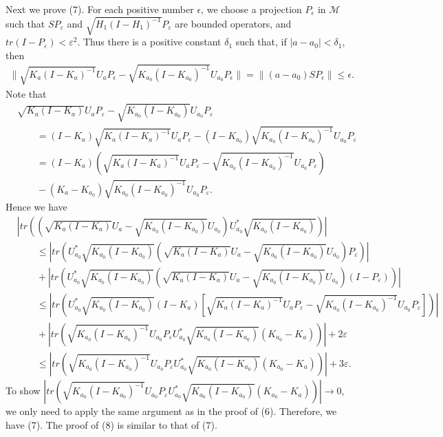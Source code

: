 \documentclass[12pt]{article}
\newcommand{\MMM}{\mathcal M}
\begin{document}
{Next we prove (7). For each positive number $\epsilon$, we choose a
projection $P_\epsilon$ in $\MMM$ such that $SP_{\varepsilon}$ and
$\sqrt{H_{1}(I-H_{1})^{-1}}P_{\varepsilon}$ are bounded operators,
and  $tr(I - P_{\varepsilon}) < \varepsilon^{2}$. Thus there is a
positive constant $\delta_{1}$ such that, if $|a-a_{0}| <
\delta_{1}$, then
\begin{align*}
\| \sqrt{K_a(I-K_a)^{-1}}U_{a}P_{\epsilon} -
\sqrt{K_{a_0}(I-K_{a_{0}})^{-1}}U_{a_0}P_{\epsilon}  \| = \|(a - a_0)SP_{\epsilon}  \| \leq
\epsilon .
\end{align*}
Note that
\begin{align*}
&\sqrt{K_{a}(I-K_{a})}U_{a}P_{\varepsilon}
-\sqrt{K_{a_0}(I-K_{a_0})}U_{a_0}P_{\varepsilon}\\
& \qquad =(I-K_a)\sqrt{K_{a}(I-K_{a})^{-1}}U_{a}P_{\varepsilon}-(I-K_{a_0})\sqrt{K_{a_{0}}(I-K_{a_{0}})^{-1}}U_{a_0}P_{\varepsilon}\\
& \qquad =(I-K_a)(\sqrt{K_{a}(I-K_{a})^{-1}}U_{a}P_{\varepsilon}-\sqrt{K_{a_{0}}(I-K_{a_{0}})^{-1}}U_{a_0}P_{\varepsilon})\\
& \qquad    -(K_a-K_{a_0})\sqrt{K_{a_{0}}(I-K_{a_{0}})^{-1}}U_{a_0}P_{\varepsilon}.
\end{align*}
Hence we have
\begin{align*}
&|tr((\sqrt{K_{a}(I-K_{a})}U_{a}
-\sqrt{K_{a_0}(I-K_{a_0})}U_{a_0})U^{*}_{a_0}\sqrt{K_{a_0}(I-K_{a_0})})|
\\
&\qquad \leq
|tr(U^{*}_{a_0}\sqrt{K_{a_0}(I-K_{a_0})}(\sqrt{K_{a}(I-K_{a})}U_{a}
-\sqrt{K_{a_0}(I-K_{a_0})}U_{a_0})P_{\varepsilon})
| \\
&\qquad +
|tr(U^{*}_{a_0}\sqrt{K_{a_0}(I-K_{a_0})}(\sqrt{K_{a}(I-K_{a})}U_{a}
-\sqrt{K_{a_0}(I-K_{a_0})}U_{a_0})(I-P_{\varepsilon}))
| \\
&\qquad\leq
|tr(U^{*}_{a_0}\sqrt{K_{a_0}(I-K_{a_0})}(I-K_{a})[\sqrt{K_a(I-K_a)^{-1}}U_{a}P_{\varepsilon}
- \sqrt{K_{a_0}(I-K_{a_{0}})^{-1}}U_{a_0}P_{\varepsilon}]) | \\
& \qquad +
|tr(\sqrt{K_{a_0}(I-K_{a_{0}})^{-1}}U_{a_0}P_{\varepsilon}U^{*}_{a_0}\sqrt{K_{a_0}(I-K_{a_0})}(K_{a_0}
-K_a))| + 2\varepsilon \\
&\qquad \leq
|tr(\sqrt{K_{a_0}(I-K_{a_{0}})^{-1}}U_{a_0}P_{\varepsilon}U^{*}_{a_0}\sqrt{K_{a_0}(I-K_{a_0})}(K_{a_0}
-K_a))| + 3\varepsilon.
\end{align*}
To show
$|tr(\sqrt{K_{a_0}(I-K_{a_{0}})^{-1}}U_{a_0}P_{\varepsilon}U^{*}_{a_0}\sqrt{K_{a_0}(I-K_{a_0})}(K_{a_0}
-K_a))| \rightarrow 0$, we only need to apply the same argument as
in the proof of (6). Therefore, we have (7). The proof of (8) is
similar to that of (7).

}
\end{document}
